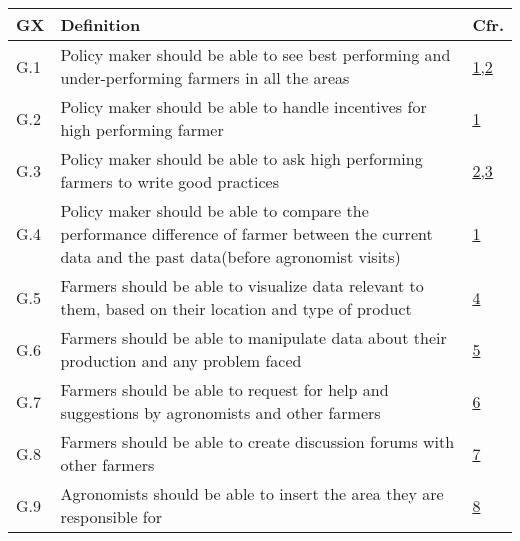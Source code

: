 \begin{table}[H]
    \setlength\arrayrulewidth{1pt}
    \centering
    \begin{tabular}{|l|m{}|l|}
        \rowcolor{myblue}
        \hline
        \color{white}GX & \color{white}Definition   & \color{white}Cfr.\\
        \hline
        G.1                                               &     Policy maker should be able to see best performing and under-performing farmers in all the areas &   \hyperref[sec:policyMakersNeeds]{1,2} \\
        \hline
        G.2                                                      &  Policy maker should be able to handle incentives for high performing farmer   &    \hyperref[sec:policyMakersNeeds]{1}\\
        \hline
        G.3                                     &   Policy maker should be able to ask high performing farmers to write good practices   &   \hyperref[sec:policyMakersNeeds]{2,3} \\
        \hline
        G.4                                              &   Policy maker should be able to compare the performance difference of farmer between the current data and the past data(before agronomist visits)     &   \hyperref[sec:policyMakersNeeds]{1} \\
        \hline
        G.5                                  &   Farmers should be able to visualize data relevant to them, based on their location and type of product   &   \hyperref[sec:farmersNeeds]{4} \\
        \hline
        G.6                                                      &  Farmers should be able to manipulate data about their production and any problem faced   &    \hyperref[sec:farmersNeeds]{5}\\%
        \hline
        G.7                                               &     Farmers should be able to request for help and suggestions by agronomists and other farmers &   \hyperref[sec:farmersNeeds]{6} \\
        \hline
        G.8                                              &   Farmers should be able to create discussion forums with other farmers     &   \hyperref[sec:farmersNeeds]{7} \\
        \hline
        G.9                                  &   Agronomists should be able to insert the area they are responsible for   &   \hyperref[sec:agronomistsNeeds]{8} \\

\end{tabular}
\end{table}
